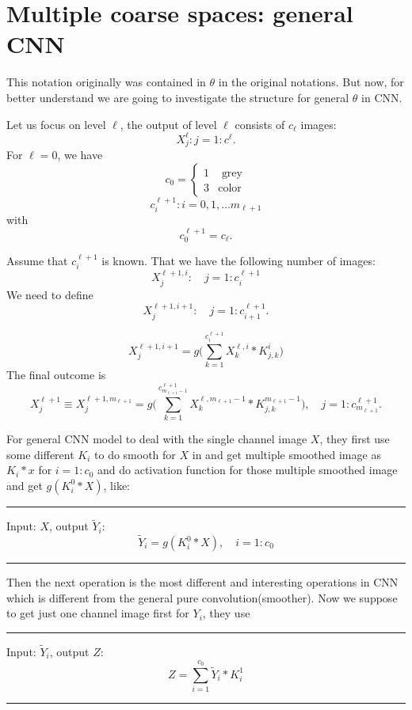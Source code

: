 \section{Multiple coarse spaces: general CNN}
This notation originally was contained in $\theta$ in the original
notations. But now, for better understand we are going to investigate
the structure for general $\theta$ in CNN.

Let us focus on level $\ell$, the output of level $\ell$ consists of
$c_\ell$ images:
\begin{equation}
  \label{Xl}
X^\ell_{j}:  j=1:c^\ell.  
\end{equation}
For $\ell=0$, we have
$$
c_0=
\left\{
  \begin{array}{lr}
1 & \mbox{ grey}\\    
3 & \mbox{color}
  \end{array}
\right.
$$
$$
c^{\ell+1}_i: i=0,1,\ldots m_{\ell+1}
$$
with 
$$
c^{\ell+1}_0=c_\ell.
$$

Assume that $c^{\ell+1}_{i}$ is known.   That we have the following
number of images:
$$
X^{\ell+1,i}_{j}:\quad j=1:c^{\ell+1}_i
$$
We need to define
$$
X^{\ell+1,i+1}_{j}:\quad j=1:c^{\ell+1}_{i+1}.
$$

$$
X^{\ell+1,i+1}_{j}=
g\bigg(
\sum_{k =1}^{c^{\ell+1}_{i}}X_k^{\ell, i}\ast K^i_{j,k}
\bigg) 
$$
The final outcome is
$$
X^{\ell+1}_{j}\equiv 
X^{\ell+1,m_{\ell+1}}_{j}= 
g\bigg(
\sum_{k =1}^{c^{\ell+1}_{m_{\ell+1}-1}}X_k^{\ell, m_{\ell+1}-1}\ast K^{m_{\ell+1}-1}_{j,k}
\bigg),\quad  j=1:c^{\ell+1}_{m_{\ell+1}}.
$$

For general CNN model to deal with the single channel image $X$, they first use some different $K_i$ to do smooth for $X$ in and get multiple smoothed image as $K_i \ast x$ for $i = 1:c_0$ and do activation function for those multiple smoothed image and get $g(K^0_i \ast X)$, like:
\bigskip
\hrule
Input: $X$, output $\tilde Y_i$:
\begin{equation}
\tilde Y_i = g(K^0_i \ast X), \quad i = 1:c_0
\end{equation}
\hrule
\bigskip
Then the next operation is the most different and interesting operations in CNN which is different from the general pure convolution(smoother). Now we suppose to get just one channel image first for $Y_i$, they use
\bigskip
\hrule
Input: $\tilde Y_i$, output $Z$:
\begin{equation}
Z = \sum_{i=1}^{c_0} \tilde Y_i \ast K^1_i
\end{equation}
\hrule


